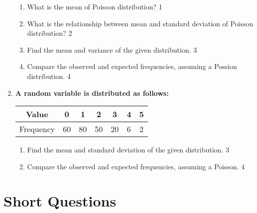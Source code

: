 \documentclass[a4paper,oneside, margin=1.4in]{book}
\begin{document}
\begin{enumerate}
  \begin{enumerate}
    \item
	What is the mean of Poisson distribution? \hfill 1
    \item
	What is the relationship between mean and standard deviation of Poisson 
	distribution? \hfill 2
    \item  
	Find the mean and variance of the given distribution. \hfill 3
    \item
	Compare the observed and expected frequencies, assuming a Possion 
	distribution. \hfill 4
  \end{enumerate}
  
  \item  
\textbf{A random variable is distributed as follows:}  

\begin{table}[h]
\centering
\begin{tabular}{c|c|c|c|c|c|c}
Value & 0 & 1 & 2 & 3 & 4 & 5 \\ \hline
Frequency & 60 & 80 & 50 & 20 & 6 & 2
\end{tabular}
\end{table}

\begin{enumerate}
    \item  
    Find the mean and standard deviation of the given distribution. \hfill 3
    \item  
    Compare the observed and expected frequencies, assuming a Poisson. \hfill 4
\end{enumerate}


  \end{enumerate}

\section{Short Questions}
\end{document}
